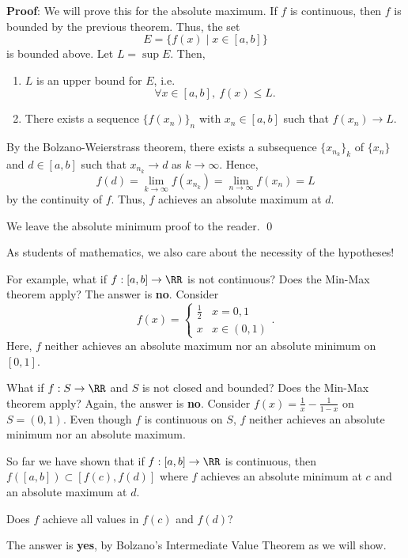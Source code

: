 \textbf{Proof}: We will prove this for the absolute maximum. If $f$ is continuous, then $f$ is bounded by the previous theorem. Thus, the set
\[
E = \{f(x) \mid x\in [a,b]\}
\]
is bounded above. Let $L = \sup E$. Then, 
\begin{enumerate}
    \item $L$ is an upper bound for $E$, i.e.
    \[\forall x\in [a,b],~ f(x)\leq L.\]
    \item There exists a sequence $\{f(x_n)\}_n$ with $x_n\in [a,b]$ such that $f(x_n) \to L$.
\end{enumerate}
By the Bolzano-Weierstrass theorem, there exists a subsequence $\{x_{n_k}\}_k$ of $\{x_n\}$ and $d\in [a,b]$ such that $x_{n_k}\to d$ as $k\to \infty$. Hence,
\[
f(d) = \lim_{k\to \infty} f(x_{n_k}) = \lim_{n\to \infty} f(x_n) = L
\]
by the continuity of $f$. Thus, $f$ achieves an absolute maximum at $d$.

We leave the absolute minimum proof to the reader. \qed 

\begin{remark}
As students of mathematics, we also care about the necessity of the hypotheses!
\end{remark}
For example, what if $f:[a,b]\to \RR$ is not continuous? Does the Min-Max theorem apply? The answer is \textbf{no}. Consider 
\[
f(x) = \begin{cases}
\frac{1}{2} & x=0,1 \\
x &x\in(0,1)
\end{cases}.
\]
Here, $f$ neither achieves an absolute maximum nor an absolute minimum on $[0,1]$.

What if $f:S\to \RR$ and $S$ is not closed and bounded? Does the Min-Max theorem apply? Again, the answer is \textbf{no}. Consider $f(x) = \frac{1}{x} - \frac{1}{1-x}$ on $S= (0,1)$. Even though $f$ is continuous on $S$, $f$ neither achieves an absolute minimum nor an absolute maximum.

So far we have shown that if $f:[a,b]\to \RR$ is continuous, then $f([a,b]) \subset [f(c),f(d)]$ where $f$ achieves an absolute minimum at $c$ and an absolute maximum at $d$.

\begin{question}
Does $f$ achieve all values in $f(c)$ and $f(d)$?
\end{question}
The answer is \textbf{yes}, by Bolzano's Intermediate Value Theorem as we will show.


